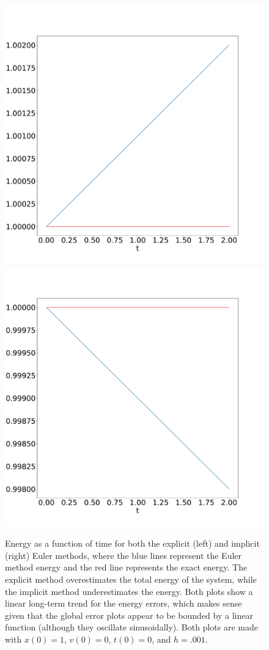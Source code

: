 \documentclass[11pt, oneside]{article}   	%
\begin{document}
\begin{section}
\begin{figure}[H]
\includegraphics[width=.5\textwidth, height=.35\textheight]{energyPlot.pdf}
\includegraphics[width=.5\textwidth, height=.35\textheight]{energy2.pdf}
\caption{Energy as a function of time for both the explicit (left) and implicit (right) Euler methods, where the blue lines represent the Euler method energy and the red line represents the exact energy. The explicit method overestimates the total energy of the system, while the implicit method underestimates the energy. Both plots show a linear long-term trend for the energy errors, which makes sense given that the global error plots appear to be bounded by a linear function (although they oscillate sinusoidally). Both plots are made with $x(0) = 1$, $v(0) = 0$, $t(0) = 0$, and $h = .001$.}
\end{figure}


\end{section}
\end{document}
